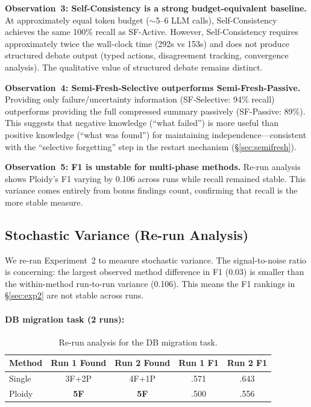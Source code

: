\documentclass[11pt]{article}
\begin{document}
\textbf{Observation~3: Self-Consistency is a strong budget-equivalent baseline.} At approximately equal token budget ($\sim$5--6 LLM calls), Self-Consistency achieves the same 100\% recall as SF-Active. However, Self-Consistency requires approximately twice the wall-clock time (292s vs 153s) and does not produce structured debate output (typed actions, disagreement tracking, convergence analysis). The qualitative value of structured debate remains distinct.

\textbf{Observation~4: Semi-Fresh-Selective outperforms Semi-Fresh-Passive.} Providing only failure/uncertainty information (SF-Selective: 94\% recall) outperforms providing the full compressed summary passively (SF-Passive: 89\%). This suggests that negative knowledge (``what failed'') is more useful than positive knowledge (``what was found'') for maintaining independence---consistent with the ``selective forgetting'' step in the restart mechanism (\S\ref{sec:semifresh}).

\textbf{Observation~5: F1 is unstable for multi-phase methods.} Re-run analysis shows Ploidy's F1 varying by 0.106 across runs while recall remained stable. This variance comes entirely from bonus findings count, confirming that recall is the more stable measure.

\subsection{Stochastic Variance (Re-run Analysis)}
\label{sec:rerun}

We re-ran Experiment~2 to measure stochastic variance. The signal-to-noise ratio is concerning: the largest observed method difference in F1 (0.03) is smaller than the within-method run-to-run variance (0.106). This means the F1 rankings in \S\ref{sec:exp2} are not stable across runs.

\paragraph{DB migration task (2 runs):}

\begin{table}[H]
\centering
\caption{Re-run analysis for the DB migration task.}
\label{tab:rerun}
\small
\begin{tabular}{@{}lcccc@{}}
\toprule
\textbf{Method} & \textbf{Run 1 Found} & \textbf{Run 2 Found} & \textbf{Run 1 F1} & \textbf{Run 2 F1} \\
\midrule
Single & 3F+2P & 4F+1P & .571 & .643 \\
Ploidy & \textbf{5F} & \textbf{5F} & .500 & .556 \\
\bottomrule
\end{tabular}
\end{table}
\end{document}
